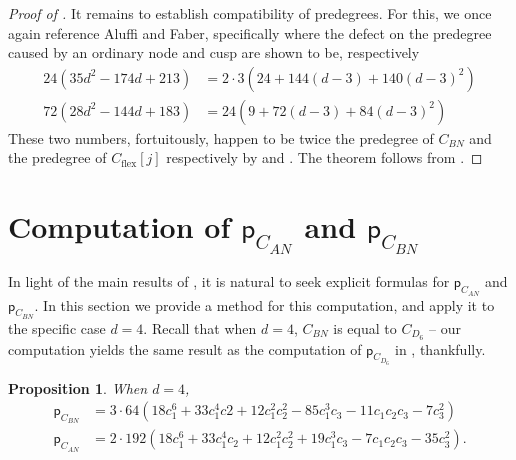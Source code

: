 \documentclass[12 pt, reqno]{amsart}
\newtheorem{prop}[thm]{Proposition}
\theoremstyle{definition}
\newcommand{\on}{\operatorname}
\newcommand{\p}{\mathsf{p}}
\begin{document}
\begin{proof}[Proof of ]
It remains to establish compatibility of predegrees. For this, we once
again reference Aluffi and Faber, specifically \cite[Example 4.1 and
Example 5.2]{AF00} where the defect on the predegree caused by an
ordinary node and cusp are shown to be, respectively
  \begin{align*}
     24 (35 d^2 - 174 d + 213)&=2\cdot 3(24+144(d-3)+140(d-3)^2) \\ 72 (28 d^2 - 144 d + 183)&=24(9+72(d-3)+84(d-3)^2) \end{align*}
  These two numbers, fortuitously, happen to be twice the predegree of
  $C_{BN}$ and the predegree of $C_{\on{flex}}[j]$ respectively by
   and .  The
  theorem follows from .
\end{proof}




























  
  \section{Computation of $\p_{C_{AN}}$ and $\p_{C_{BN}}$}
\label{CAN}
In light of the main results of , it is natural to
seek explicit formulas for $\p_{C_{AN}}$ and $\p_{C_{BN}}$. In this
section we provide a method for this computation, and apply it to the
specific case $d=4$. Recall that when $d=4$, $C_{BN}$ is equal to
$C_{D_{6}}$ -- our computation yields the same result as the
computation of $\p_{C_{D_{6}}}$ in , thankfully.


\begin{prop}\label{prop:CAN}
  When $d=4$,
\begin{align*}
  \p_{C_{BN}}&=3 \cdot 64 (18 c_1^6 + 33 c_1^4 c2 + 12 c_1^2 c_2^2 - 85 c_1^3 c_3 - 11 c_1 c_2 c_3 - 
              7 c_3^2)\\
  \p_{C_{AN}}&=2 \cdot 192 (18 c_1^6 + 33 c_1^4 c_2 + 12 c_1^2 c_2^2 + 19 c_1^3 c_3 - 7 c_1 c_2 c_3 - 
              35 c_3^2).
\end{align*}
\end{prop}
\end{document}
